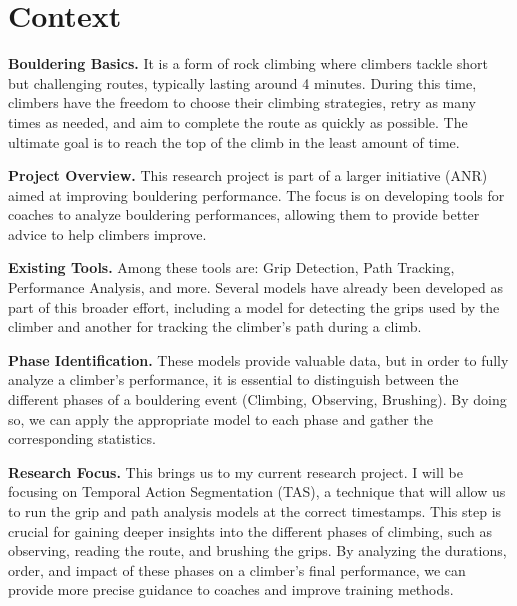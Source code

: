 \section{Context}
\label{section:context}

\noindent\textbf{Bouldering Basics.} 
It is a form of rock climbing where climbers tackle short but challenging routes, typically lasting around 4 minutes. During this time, climbers have the freedom to choose their climbing strategies, retry as many times as needed, and aim to complete the route as quickly as possible. The ultimate goal is to reach the top of the climb in the least amount of time.

\noindent\textbf{Project Overview.} 
This research project is part of a larger initiative (ANR) aimed at improving bouldering performance. The focus is on developing tools for coaches to analyze bouldering performances, allowing them to provide better advice to help climbers improve.

\noindent\textbf{Existing Tools.} 
Among these tools are: Grip Detection, Path Tracking, Performance Analysis, and more. Several models have already been developed as part of this broader effort, including a model for detecting the grips used by the climber and another for tracking the climber's path during a climb.

\noindent\textbf{Phase Identification.} 
These models provide valuable data, but in order to fully analyze a climber's performance, it is essential to distinguish between the different phases of a bouldering event (Climbing, Observing, Brushing). By doing so, we can apply the appropriate model to each phase and gather the corresponding statistics.

\noindent\textbf{Research Focus.} 
This brings us to my current research project. I will be focusing on Temporal Action Segmentation (TAS), a technique that will allow us to run the grip and path analysis models at the correct timestamps. This step is crucial for gaining deeper insights into the different phases of climbing, such as observing, reading the route, and brushing the grips. By analyzing the durations, order, and impact of these phases on a climber's final performance, we can provide more precise guidance to coaches and improve training methods.

